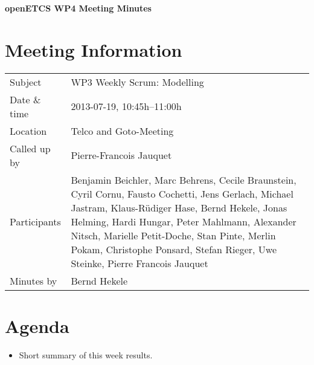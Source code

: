 \documentclass[a4paper, 11pt]{article}
\begin{document}
{\begin{center}\huge\bf openETCS WP4 Meeting Minutes\end{center}}
\section{Meeting Information}

\renewcommand{\arraystretch}{1.5}
\begin{supertabular}{m{.2\textwidth}m{.8\textwidth}}
Subject & WP3 Weekly Scrum: Modelling\\
Date \& time & 2013-07-19, 10:45h--11:00h\\
Location & Telco and Goto-Meeting\\
Called up by & Pierre-Francois Jauquet\\
Participants &
Benjamin Beichler,
Marc Behrens,
Cecile Braunstein,
Cyril Cornu,
Fausto Cochetti,
Jens Gerlach,
Michael Jastram,
Klaus-R\"udiger Hase,
Bernd Hekele,
Jonas Helming,
Hardi Hungar,
Peter Mahlmann,
Alexander Nitsch,
Marielle Petit-Doche,
Stan Pinte,
Merlin Pokam,
Christophe Ponsard,
Stefan Rieger,
Uwe Steinke,
Pierre Francois Jauquet
\\

Minutes by & Bernd Hekele\\

\end{supertabular}
\renewcommand{\arraystretch}{1.0}


\section{{Agenda}}
\begin{itemize}
\item Short summary of this week results.
\end{itemize}
\end{document}
